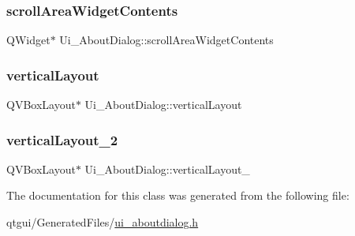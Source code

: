 \subsubsection{\texorpdfstring{scrollAreaWidgetContents}{scrollAreaWidgetContents}}
{\footnotesize\ttfamily Q\+Widget$\ast$ Ui\+\_\+\+About\+Dialog\+::scroll\+Area\+Widget\+Contents}

\mbox{\label{class_ui___about_dialog_ad9a707b99263cd8c14df8bc5ea562255}} 
\subsubsection{\texorpdfstring{verticalLayout}{verticalLayout}}
{\footnotesize\ttfamily Q\+V\+Box\+Layout$\ast$ Ui\+\_\+\+About\+Dialog\+::vertical\+Layout}

\mbox{\label{class_ui___about_dialog_a2d344108372e8a8c12011b83a7c18cd7}} 
\subsubsection{\texorpdfstring{verticalLayout\_2}{verticalLayout\_2}}
{\footnotesize\ttfamily Q\+V\+Box\+Layout$\ast$ Ui\+\_\+\+About\+Dialog\+::vertical\+Layout\+\_}



The documentation for this class was generated from the following file\+:\begin{DoxyCompactItemize}
\item 
qtgui/\+Generated\+Files/\mbox{\hyperlink{ui__aboutdialog_8h}{ui\+\_\+aboutdialog.\+h}}\end{DoxyCompactItemize}
